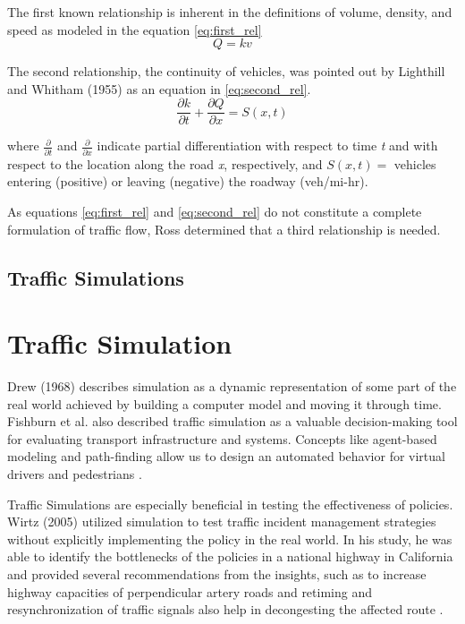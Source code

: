 The first known relationship is inherent in the definitions of volume, density, and speed as modeled in the equation \eqref{eq:first_rel}
\begin{equation}
    Q = kv
    \label{eq:first_rel}
\end{equation}

The second relationship, the continuity of vehicles, was pointed out by Lighthill and Whitham (1955) as an equation in \eqref{eq:second_rel}.
\begin{equation}
    \frac{\partial k}{\partial t} + \frac{\partial Q}{\partial x} = S(x, t)
    \label{eq:second_rel}
\end{equation}

where $\frac{\partial}{\partial t}$ and $\frac{\partial}{\partial x}$ indicate partial differentiation with respect to time \textit{t} and with respect to the location along the road \textit{x}, respectively, and $S(x, t)=$ vehicles entering (positive) or leaving (negative) the roadway (veh/mi-hr).

As equations \eqref{eq:first_rel} and \eqref{eq:second_rel} do not constitute a complete formulation of traffic flow, Ross determined that a third relationship is needed.

\subsection{Traffic Simulations}
\section{Traffic Simulation}
Drew (1968) describes simulation as a dynamic representation of some part of the real world achieved by building a computer model and moving it through time. Fishburn et al. also described traffic simulation as a valuable decision-making tool for evaluating transport infrastructure and systems.  Concepts like agent-based modeling and path-finding allow us to design an automated behavior for virtual drivers and pedestrians \cite{drew1968traffic}.

Traffic Simulations are especially beneficial in testing the effectiveness of policies. Wirtz (2005) utilized simulation to test traffic incident management strategies without explicitly implementing the policy in the real world. In his study, he was able to identify the bottlenecks of the policies in a national highway in California and provided several recommendations from the insights, such as to increase highway capacities of perpendicular artery roads and retiming and resynchronization of traffic signals also help in decongesting the affected route \cite{wirtz2004using}.


